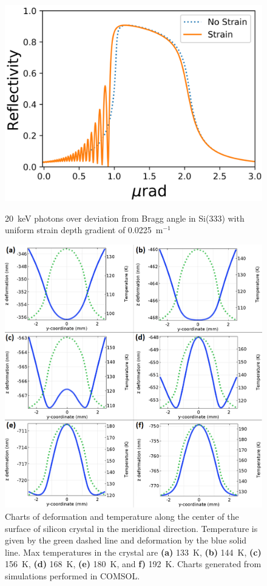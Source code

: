 \documentclass{iucr}
\begin{document}
\begin{figure}
\caption{20~keV photons over deviation from Bragg angle in Si(333) with uniform strain depth gradient of 0.0225~m$^{-1}$}
\includegraphics[width = \textwidth]{images/333USG.png}
\label{fig:333USG}
\end{figure}

\begin{figure}

\caption{Charts of deformation and temperature along the center of the surface of silicon crystal in the meridional direction. Temperature is given by the green dashed line and deformation by the blue solid line. Max temperatures in the crystal are \textbf{(a)} 133~K, \textbf{(b)} 144~K, \textbf{(c)} 156~K, \textbf{(d)} 168~K, \textbf{(e)} 180~K, and \textbf{f)} 192~K. Charts generated from simulations performed in COMSOL.}
\includegraphics[width = \textwidth]{images/deformation.png}

\label{fig:ydeformation}
\end{figure}
\end{document}
